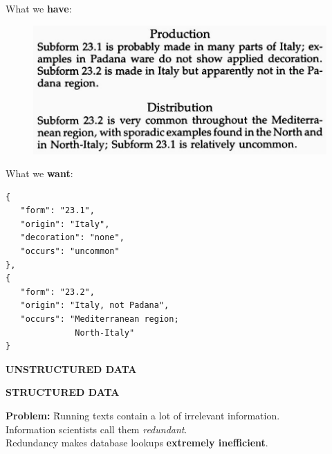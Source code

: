 \documentclass[xcolor=x11names, aspectratio=169,usenames,dvipsnames]{beamer}
\begin{document}
\begin{frame}[fragile]{}
\begin{minipage}[t]{0.45\textwidth}
What we \textbf{have}:\medskip

\begin{figure}
\includegraphics[width=1.0\textwidth]{img/consp_ex.jpg}
\end{figure}
\end{minipage}\hfill\pause
\begin{minipage}[t]{0.45\textwidth}
What we \textbf{want}:\medskip
{\scriptsize
\begin{verbatim}
{
   "form": "23.1",
   "origin": "Italy",
   "decoration": "none",
   "occurs": "uncommon"
},
{
   "form": "23.2",
   "origin": "Italy, not Padana",
   "occurs": "Mediterranean region;
              North-Italy"
}
\end{verbatim}
}
\end{minipage}\pause\medskip

\begin{minipage}[t]{0.45\textwidth}
\begin{center}
\alert{\textbf{UNSTRUCTURED DATA}}
\end{center}
\end{minipage}\hfill
\begin{minipage}[t]{0.45\textwidth}
\begin{center}
\alert{\textbf{STRUCTURED DATA}}
\end{center}
\end{minipage}

\end{frame}

\begin{frame}
\begin{tabbing}
\qquad\textbf{Problem:} \= Running texts contain a lot of \alert{irrelevant information}.\\[.5em]

\> Information scientists call them \textit{redundant}.\\[.5em]

\> Redundancy makes database lookups \alert{\textbf{extremely inefficient}}.
\end{tabbing}
\end{frame}
\end{document}
